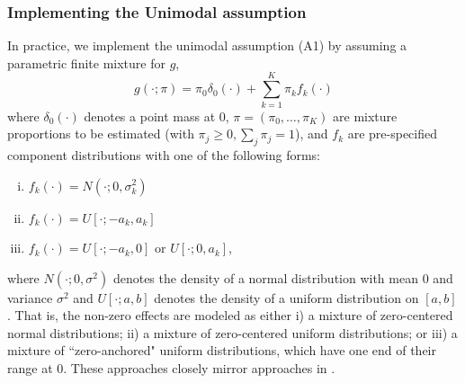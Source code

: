 \documentclass[11pt]{article}
\def\bhat{\hat{\beta}}
\def\shat{\hat{s}}
\begin{document}

\subsubsection*{Implementing the Unimodal assumption}
 
In practice, we implement the unimodal assumption (A1) by assuming a parametric finite mixture for $g$, 
\begin{equation} \label{eqn:g}
g(\cdot; \pi) = \pi_0 \delta_0(\cdot) + \sum_{k=1}^K \pi_k f_k(\cdot) 
\end{equation}
where $\delta_0(\cdot)$ denotes a point mass at 0, $\pi=(\pi_0,\dots,\pi_K)$ are mixture proportions to be estimated (with $\pi_j \geq 0, \sum_j \pi_j=1$), and $f_k$ are pre-specified 
component distributions with one of the following forms: 
\begin{enumerate}[i)]
\item $f_k(\cdot) = N(\cdot; 0, \sigma^2_k)$
\item $f_k(\cdot) = U[\cdot; -a_k,a_k]$
\item $f_k(\cdot) = U[\cdot; -a_k,0] \text{ or } U[\cdot; 0,a_k]$,
\end{enumerate}
where $N(\cdot; 0,\sigma^2)$ denotes the density of a normal distribution with mean 0 and variance $\sigma^2$ and
$U[\cdot; a,b]$ denotes the density of a uniform distribution on $[a,b]$.
That is, the non-zero effects are modeled as either i) a mixture of zero-centered normal distributions; ii) a mixture of zero-centered uniform distributions;
or iii) a mixture of ``zero-anchored" uniform distributions, which have one end of their range at 0. These approaches closely mirror approaches in \cite{cordy1997deconvolution}.
 
\end{document}
